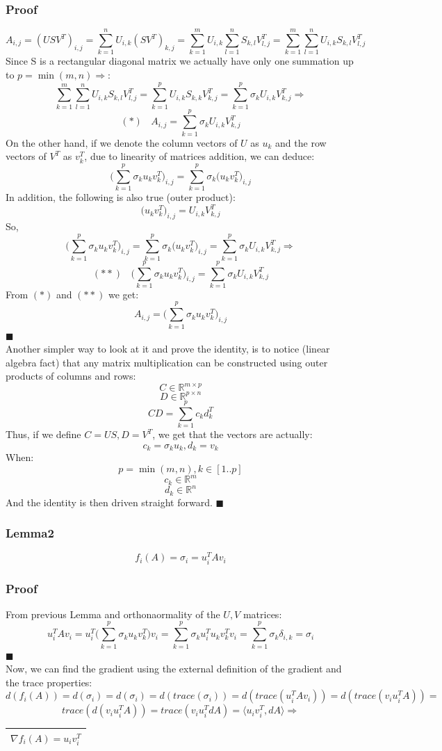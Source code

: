 \documentclass[12pt]{article}
\newcommand{\rectres}[1]{
\begin{center}
\begin{tabular}{ |c| }
\hline
 #1\\
\hline
\end{tabular}
\end{center}
}
\newcommand{\qed}{\hfill$\blacksquare$}
\begin{document}
\subsubsection*{Proof}
$$A_{i,j}=(USV^T)_{i,j}=\sum_{k=1}^n U_{i,k} (SV^T)_{k,j}=\sum_{k=1}^m U_{i,k} \sum_{l=1}^n S_{k,l}V^T_{l,j}=\sum_{k=1}^m \sum_{l=1}^n U_{i,k}  S_{k,l}V^T_{l,j}$$
Since S is a rectangular diagonal matrix we actually have only one summation up to $p=\min(m,n) \Rightarrow$:
$$\sum_{k=1}^m \sum_{l=1}^n U_{i,k}  S_{k,l}V^T_{l,j}=\sum_{k=1}^p U_{i,k}  S_{k,k}V^T_{k,j} =\sum_{k=1}^p\sigma_k U_{i,k}V^T_{k,j} \Rightarrow$$
$$(*)\:\:\:\:A_{i,j}=\sum_{k=1}^p\sigma_k U_{i,k}V^T_{k,j}$$
On the other hand, if we denote the column vectors of $U$ as $u_k$ and the row vectors of $V^T$ as $v^T_k$,
due to linearity of matrices addition, we can deduce:
$$\Big(\sum_{k=1}^p\sigma_k u_{k} v^T_{k}\Big)_{i,j}=\sum_{k=1}^p\sigma_k \Big(u_{k} v^T_{k}\Big)_{i,j}$$
In addition, the following is also true (outer product):
$$\Big(u_{k} v^T_{k}\Big)_{i,j}=U_{i,k}V^T_{k,j}$$
So,
$$\Big(\sum_{k=1}^p\sigma_k u_{k} v^T_{k}\Big)_{i,j}=\sum_{k=1}^p\sigma_k \Big(u_{k} v^T_{k}\Big)_{i,j}=\sum_{k=1}^p\sigma_k U_{i,k}V^T_{k,j}\Rightarrow$$
$$(**)\:\:\:\:\Big(\sum_{k=1}^p\sigma_k u_{k} v^T_{k}\Big)_{i,j}=\sum_{k=1}^p\sigma_k U_{i,k}V^T_{k,j}$$
From $(*)$ and $(**)$ we get:
$$A_{i,j}=\Big(\sum_{k=1}^p\sigma_k u_{k} v^T_{k}\Big)_{i,j}$$
\qed\\
Another simpler way to look at it and prove the identity, is to notice (linear algebra fact) that any matrix multiplication can be constructed using outer products of columns and rows:
$$C \in \mathbb{R}^{m\times p}$$
$$D \in \mathbb{R}^{p\times n}$$
$$CD=\sum_{k=1}^p c_{k} d^T_{k}$$
Thus,
if we define $C=US, D=V^T$, we get that the vectors are actually:  
$$c_{k}=\sigma_k u_{k}, d_{k}=v_{k}$$
When:
$$p=\min(m,n), k \in [1..p]$$
$$c_{k} \in \mathbb{R}^{m}$$
$$d_{k} \in \mathbb{R}^{n}$$
And the identity is then driven straight forward.
\qed\\
\subsubsection*{Lemma2}
$$f_i(A)=\sigma_i=u_i^T A v_i$$
\subsubsection*{Proof}
From previous Lemma and orthonaormality of the $U,V$ matrices:
$$u_i^T A v_i=u_i^T \Big(\sum_{k=1}^p \sigma_k u_{k} v^T_{k}\Big)v_i=\sum_{k=1}^p \sigma_k u_i^T  u_{k} v^T_{k}v_i = \sum_{k=1}^p \sigma_k \delta_{i,k}=\sigma_i$$
\qed\\
Now, we can find the gradient using the external definition of the gradient and the trace properties:
$$d(f_i(A))=d(\sigma_i)=d(\sigma_i)=d(trace(\sigma_i))=d(trace(u_i^T A v_i))=d(trace(v_i u_i^T A )) = $$
$$trace(d(v_i u_i^T A ))=trace(v_i u_i^T dA ) = \langle u_i v_i^T, dA \rangle \Rightarrow$$
\rectres{$\nabla f_i(A)=u_i v_i^T$}
\end{document}
